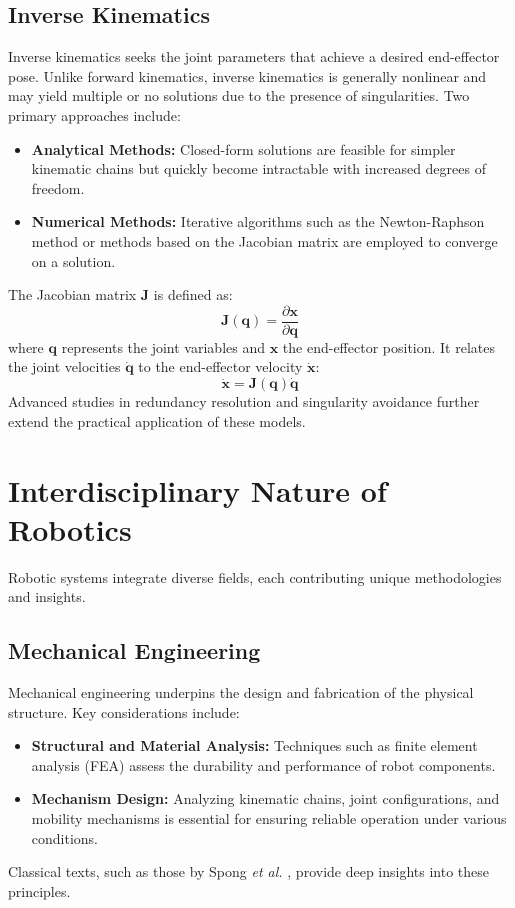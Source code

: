 \subsection{Inverse Kinematics}
Inverse kinematics seeks the joint parameters that achieve a desired end-effector pose. Unlike forward kinematics, inverse kinematics is generally nonlinear and may yield multiple or no solutions due to the presence of singularities. Two primary approaches include:
\begin{itemize}
    \item \textbf{Analytical Methods:} Closed-form solutions are feasible for simpler kinematic chains but quickly become intractable with increased degrees of freedom.
    \item \textbf{Numerical Methods:} Iterative algorithms such as the Newton-Raphson method or methods based on the Jacobian matrix are employed to converge on a solution.
\end{itemize}
The Jacobian matrix \( \mathbf{J} \) is defined as:
\[
\mathbf{J}(\mathbf{q}) = \frac{\partial \mathbf{x}}{\partial \mathbf{q}}
\]
where \( \mathbf{q} \) represents the joint variables and \( \mathbf{x} \) the end-effector position. It relates the joint velocities \( \dot{\mathbf{q}} \) to the end-effector velocity \( \dot{\mathbf{x}} \):
\[
\dot{\mathbf{x}} = \mathbf{J}(\mathbf{q}) \dot{\mathbf{q}}
\]
Advanced studies in redundancy resolution and singularity avoidance \cite{Lynch2017} further extend the practical application of these models.

\section{Interdisciplinary Nature of Robotics}
Robotic systems integrate diverse fields, each contributing unique methodologies and insights.

\subsection{Mechanical Engineering}
Mechanical engineering underpins the design and fabrication of the physical structure. Key considerations include:
\begin{itemize}
    \item \textbf{Structural and Material Analysis:} Techniques such as finite element analysis (FEA) assess the durability and performance of robot components.
    \item \textbf{Mechanism Design:} Analyzing kinematic chains, joint configurations, and mobility mechanisms is essential for ensuring reliable operation under various conditions.
\end{itemize}
Classical texts, such as those by Spong \emph{et al.} \cite{Spong2006}, provide deep insights into these principles.

